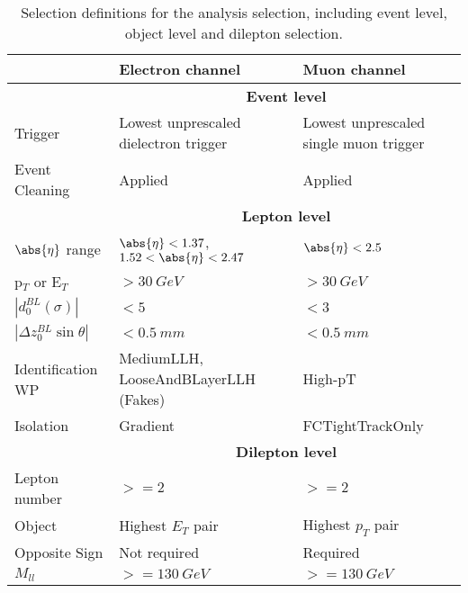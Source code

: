 \begin{table}[h]
    \centering
    {\begin{tabular}{l|p{5cm}|p{5cm}}
        & \textbf{Electron channel} & \textbf{Muon channel} \\
        \hline
        & \multicolumn{2}{c}{\textbf{Event level}} \\
        \hline
        Trigger & Lowest unprescaled \newline dielectron trigger & Lowest unprescaled \newline single muon trigger \\
        \hline
        Event Cleaning & Applied & Applied \\
        \hline
        & \multicolumn{2}{c}{\textbf{Lepton level}} \\
        \hline
        $\abs{\eta}$ range & $\abs{\eta} < 1.37$, $1.52 < \abs{\eta} < 2.47$ & $\abs{\eta} < 2.5$\\
        \hline
        p$_T$ or E$_T$ & $> 30~GeV$ &  $> 30~GeV$ \\
        \hline
        $|d_{0}^{BL}(\sigma)|$ & $< 5$  & $< 3$\\ 
        \hline
        $|\Delta z_{0}^{BL} \sin{\theta}|$ & $< 0.5~mm$ & $< 0.5~mm$ \\
        \hline
        Identification WP & MediumLLH, \newline LooseAndBLayerLLH (Fakes) & High-pT \\
        \hline
        Isolation & Gradient & FCTightTrackOnly \\
        \hline
        & \multicolumn{2}{c}{\textbf{Dilepton level}} \\
        \hline
        Lepton number & $>=2$ & $>=2$  \\
        \hline
        Object & Highest $E_T$ pair & Highest $p_T$ pair \\
        \hline
        Opposite Sign & Not required & Required \\
        \hline
        $M_{ll}$ & $>= 130~GeV$ & $>= 130~GeV$ \\

	\end{tabular}}
    \caption[Selection definitions for the analysis selection]{Selection definitions for the analysis selection, including event level, object level and dilepton selection.}
    \label{tab:sel}
  \end{table}

  \clearpage